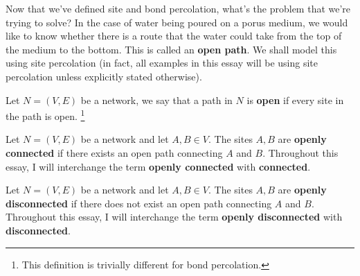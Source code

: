 

Now that we've defined site and bond percolation, what's the problem that we're trying to solve? In the case of water being poured on a porus medium, we would like to know
whether there is a route that the water could take from the top of the medium to the bottom. This is called an \textbf{open path}. We shall model this using site percolation (in fact, all examples in this essay will be using site
percolation unless explicitly stated otherwise).

\begin{definition}\label{def:open path}
  Let $N = (V, E)$ be a network, we say that a path in $N$ is \textbf{open} if every site in the path is open. \footnote{This definition is trivially different for bond
  percolation.}
\end{definition}

\begin{definition}\label{def:openly connected}
  Let $N=(V, E)$ be a network and let $A, B \in V$. The sites $A, B$ are \textbf{openly connected} if there exists an open path connecting $A$ and $B$. Throughout this essay, I
  will interchange the term \textbf{openly connected} with \textbf{connected}.
\end{definition}

\begin{definition}\label{def:openly disconnected}
  Let $N=(V, E)$ be a network and let $A, B \in V$. The sites $A, B$ are \textbf{openly disconnected} if there does not exist an open path connecting $A$ and
  $B$. Throughout this essay, I will interchange the term \textbf{openly disconnected} with \textbf{disconnected}. %
\end{definition}

